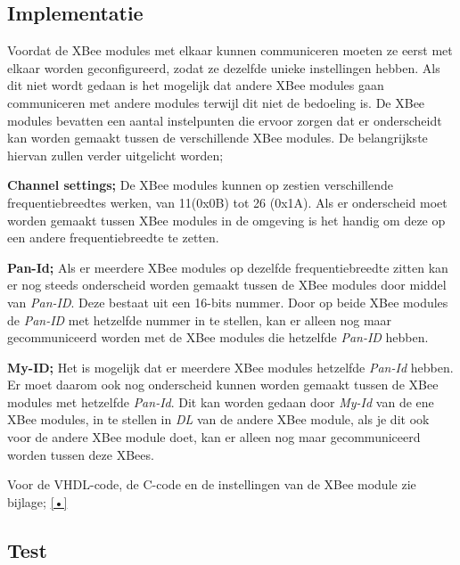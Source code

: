 \documentclass{report}
\begin{document}
\subsection{Implementatie}
Voordat de XBee modules met elkaar kunnen communiceren moeten ze eerst met elkaar worden geconfigureerd, zodat ze dezelfde unieke instellingen hebben.
Als dit niet wordt gedaan is het mogelijk dat andere XBee modules gaan communiceren met andere modules terwijl dit niet de bedoeling is.
\newline
De XBee modules bevatten een aantal instelpunten die ervoor zorgen dat er onderscheidt kan worden gemaakt tussen de verschillende XBee modules.
De belangrijkste hiervan zullen verder uitgelicht worden;
\newline

\textbf{Channel settings;}
\newline
De XBee modules kunnen op zestien verschillende frequentiebreedtes werken, van 11(0x0B) tot 26 (0x1A).
Als er onderscheid moet worden gemaakt tussen XBee modules in de omgeving is het handig om deze op een andere frequentiebreedte te zetten.
\newline

\textbf{Pan-Id;}
\newline
Als er meerdere XBee modules op dezelfde frequentiebreedte zitten kan er nog steeds onderscheid worden gemaakt tussen de XBee modules door middel van \textit{Pan-ID}.
Deze bestaat uit een 16-bits nummer.
Door op beide XBee modules de \textit{Pan-ID}  met hetzelfde nummer in te stellen, kan er alleen nog maar gecommuniceerd worden met de XBee modules die hetzelfde \textit{Pan-ID} hebben.
\newline

\textbf{My-ID;}
\newline
Het is mogelijk dat er meerdere XBee modules hetzelfde\textit{ Pan-Id} hebben.
Er moet daarom ook nog onderscheid kunnen worden gemaakt tussen de XBee modules met hetzelfde \textit{Pan-Id}.
Dit kan worden gedaan door \textit{My-Id} van de ene XBee modules, in te stellen in \textit{DL} van de andere XBee module, als je dit ook voor de andere XBee module doet, kan er alleen nog maar gecommuniceerd worden tussen deze XBees.

Voor de VHDL-code, de C-code en de instellingen van de XBee module zie bijlage; \ref{•}

\subsection{Test}
\end{document}
